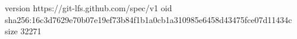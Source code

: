 version https://git-lfs.github.com/spec/v1
oid sha256:16c3d7629e70b07e19ef73b84f1b1a0cb1a310985e6458d43475fce07d11434c
size 32271
